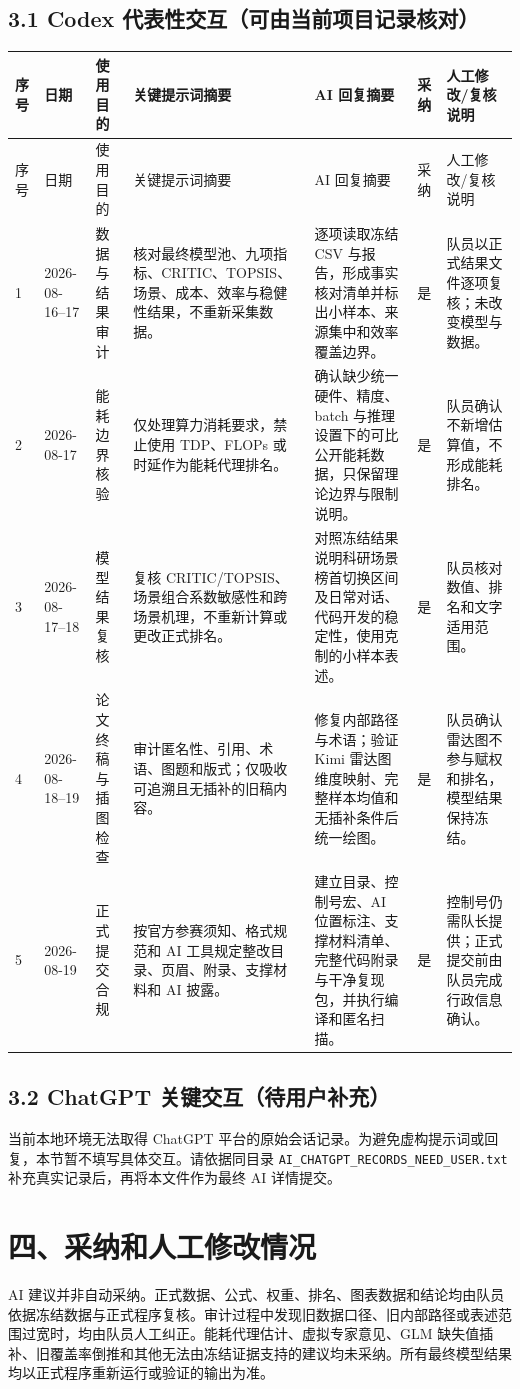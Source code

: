 \documentclass[UTF8,zihao=-4,a4paper]{ctexart}
\begin{document}
\subsection*{3.1 Codex 代表性交互（可由当前项目记录核对）}
\begingroup\scriptsize\setlength{\tabcolsep}{2pt}
\begin{longtable}{p{0.6cm}p{1.4cm}p{2.0cm}p{3.0cm}p{3.0cm}p{1.3cm}p{2.7cm}}
\toprule
序号 & 日期 & 使用目的 & 关键提示词摘要 & AI 回复摘要 & 采纳 & 人工修改/复核说明 \\
\midrule
\endfirsthead
\toprule
序号 & 日期 & 使用目的 & 关键提示词摘要 & AI 回复摘要 & 采纳 & 人工修改/复核说明 \\
\midrule
\endhead
1 & 2026-08-16--17 & 数据与结果审计 & 核对最终模型池、九项指标、CRITIC、TOPSIS、场景、成本、效率与稳健性结果，不重新采集数据。 & 逐项读取冻结 CSV 与报告，形成事实核对清单并标出小样本、来源集中和效率覆盖边界。 & 是 & 队员以正式结果文件逐项复核；未改变模型与数据。 \\
2 & 2026-08-17 & 能耗边界核验 & 仅处理算力消耗要求，禁止使用 TDP、FLOPs 或时延作为能耗代理排名。 & 确认缺少统一硬件、精度、batch 与推理设置下的可比公开能耗数据，只保留理论边界与限制说明。 & 是 & 队员确认不新增估算值，不形成能耗排名。 \\
3 & 2026-08-17--18 & 模型结果复核 & 复核 CRITIC/TOPSIS、场景组合系数敏感性和跨场景机理，不重新计算或更改正式排名。 & 对照冻结结果说明科研场景榜首切换区间及日常对话、代码开发的稳定性，使用克制的小样本表述。 & 是 & 队员核对数值、排名和文字适用范围。 \\
4 & 2026-08-18--19 & 论文终稿与插图检查 & 审计匿名性、引用、术语、图题和版式；仅吸收可追溯且无插补的旧稿内容。 & 修复内部路径与术语；验证 Kimi 雷达图维度映射、完整样本均值和无插补条件后统一绘图。 & 是 & 队员确认雷达图不参与赋权和排名，模型结果保持冻结。 \\
5 & 2026-08-19 & 正式提交合规 & 按官方参赛须知、格式规范和 AI 工具规定整改目录、页眉、附录、支撑材料和 AI 披露。 & 建立目录、控制号宏、AI 位置标注、支撑材料清单、完整代码附录与干净复现包，并执行编译和匿名扫描。 & 是 & 控制号仍需队长提供；正式提交前由队员完成行政信息确认。 \\
\bottomrule
\end{longtable}
\endgroup

\subsection*{3.2 ChatGPT 关键交互（待用户补充）}
当前本地环境无法取得 ChatGPT 平台的原始会话记录。为避免虚构提示词或回复，本节暂不填写具体交互。请依据同目录 \texttt{AI\_CHATGPT\_RECORDS\_NEED\_USER.txt} 补充真实记录后，再将本文件作为最终 AI 详情提交。

\section*{四、采纳和人工修改情况}
AI 建议并非自动采纳。正式数据、公式、权重、排名、图表数据和结论均由队员依据冻结数据与正式程序复核。审计过程中发现旧数据口径、旧内部路径或表述范围过宽时，均由队员人工纠正。能耗代理估计、虚拟专家意见、GLM 缺失值插补、旧覆盖率倒推和其他无法由冻结证据支持的建议均未采纳。所有最终模型结果均以正式程序重新运行或验证的输出为准。
\end{document}
